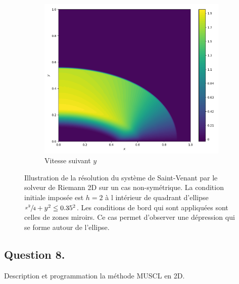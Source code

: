\documentclass[
	french,
	11pt, %
]{fphw}
\begin{document}
\begin{figure}[H]
\begin{subfigure}{0.32\textwidth}
		\label{fig:Riem4u}
	\end{subfigure}
	\begin{subfigure}{0.32\textwidth}
		\centering
		\includegraphics[width=\textwidth,height=0.85\textwidth]{Riem4v.png}
		\caption{Vitesse suivant $y$}
		\label{fig:Riem4v}
	\end{subfigure}
	\caption{Illustration de la résolution du système de Saint-Venant par le solveur de Riemann 2D sur un cas non-symétrique. La condition initiale imposée est $h = 2$ à l intérieur de quadrant d'ellipse $\sfrac{x^2}{4} + y^2 \leq 0.35^2$. Les conditions de bord qui sont appliquées sont celles de zones miroirs. Ce cas permet d'observer une dépression qui se forme autour de l'ellipse.}
	\label{fig:Riem4}
\end{figure}


\subsection*{Question 8.}

\begin{problem}
	Description et programmation la méthode MUSCL en 2D. 
\end{problem}
\end{document}
